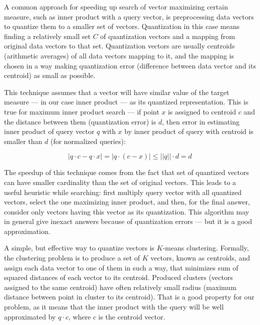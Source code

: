 
A common approach for speeding up search of vector maximizing certain measure,
such as inner product with a query vector, is preprocessing data vectors to
quantize them to a smaller set of vectors. Quantization in this case means
finding a relatively small set $C$ of quantization vectors and a mapping
from original data vectors to that set. Quantization vectors are usually
centroids (arithmetic averages) of all data vectors mapping to it, and the
mapping is chosen in a way making quantization error (difference between
data vector and its centroid) as small as possible.

This technique assumes that a vector
will have similar value of the target measure --- in our case inner product --- 
as its quantized representation.
This is true for maximum inner product search --- if point $x$ is assigned
to centroid $c$ and the distance between them (quantization error) is $d$,
then error in estimating inner product of query vector $q$ with $x$ by inner
product of query with centroid is smaller than $d$ (for normalized queries):

$$ |q \cdot c - q \cdot x | = | q \cdot ( c - x ) | \le ||q|| \cdot d = d $$

The speedup of this technique comes from the fact that set of quantized vectors
can have smaller cardinality than the set of original vectors. This leads to a 
useful heuristic while searching: first multiply 
query vector with all quantized vectors, select the one maximizing inner
product, and then, for the final answer, consider only vectors having this vector
as its quantization. This algorithm may in general give inexact answers
because of quantization errors --- but it is a good approximation.

A simple, but effective way to quantize vectors is $K$-means clustering.
Formally, the clustering problem is to produce a set of $K$ vectors, known as centroids, and assign
each data vector to one of them in such a way, that minimizes sum of squared
distances of each vector to its centroid. Produced clusters (vectors
assigned to the same centroid) have often relatively small radius (maximum
distance between point in cluster to its centroid). That is a good property 
for our problem, as it means that the inner product with the query will be well approximated
by $q \cdot c$, where $c$ is the centroid vector.

